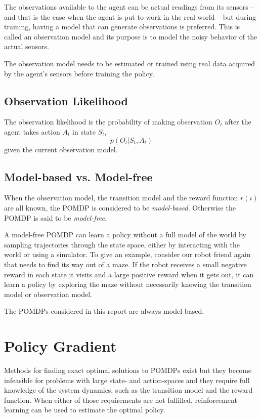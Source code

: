 The observations available to the agent can be actual readings from its sensors -- and that is the case when the agent is put to work in the real world -- but during training, having a model that can generate observations is preferred. This is called an observation model and its purpose is to model the noisy behavior of the actual sensors.

The observation model needs to be estimated or trained using real data acquired by the agent's sensors before training the policy.

\subsection{Observation Likelihood}
\label{sec:ObservationLikelihood}
The observation likelihood is the probability of making observation $O_t$ after the agent takes action $A_t$ in state $S_{t}$,
\begin{equation}
  p(O_t|S_t, A_t)
\end{equation}
given the current observation model.

\subsection{Model-based vs. Model-free}
\label{sec:ModelBasedvsModelFree}
When the observation model, the transition model and the reward function $r(i)$ are all known, the POMDP is considered to be \emph{model-based}. Otherwise the POMDP is said to be \emph{model-free}.

A model-free POMDP can learn a policy without a full model of the world by sampling trajectories through the state space, either by interacting with the world or using a simulator. To give an example, consider our robot friend again that needs to find its way out of a maze. If the robot receives a small negative reward in each state it visits and a large positive reward when it gets out, it can learn a policy by exploring the maze without necessarily knowing the transition model or observation model.

The POMDPs considered in this report are always model-based.

\section{Policy Gradient}
\label{sec:PolicyGradient}
Methods for finding exact optimal solutions to POMDPs exist but they become infeasible for problems with large state- and action-spaces and they require full knowledge of the system dynamics, such as the transition model and the reward function. When either of those requirements are not fulfilled, reinforcement learning can be used to estimate the optimal policy.

